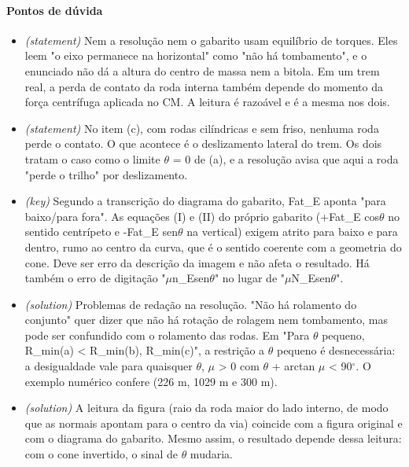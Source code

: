 \documentclass{article}%
\begin{document}
\paragraph{Pontos de dúvida}%
\begin{itemize}%
\item%
\textit{(statement)} Nem a resolução nem o gabarito usam equilíbrio de torques. Eles leem "o eixo permanece na horizontal" como "não há tombamento", e o enunciado não dá a altura do centro de massa nem a bitola. Em um trem real, a perda de contato da roda interna também depende do momento da força centrífuga aplicada no CM. A leitura é razoável e é a mesma nos dois.%
\item%
\textit{(statement)} No item (c), com rodas cilíndricas e sem friso, nenhuma roda perde o contato. O que acontece é o deslizamento lateral do trem. Os dois tratam o caso como o limite $\theta$ = 0 de (a), e a resolução avisa que aqui a roda "perde o trilho" por deslizamento.%
\item%
\textit{(key)} Segundo a transcrição do diagrama do gabarito, Fat\_E aponta "para baixo/para fora". As equações (I) e (II) do próprio gabarito (+Fat\_E cos$\theta$ no sentido centrípeto e -Fat\_E sen$\theta$ na vertical) exigem atrito para baixo e para dentro, rumo ao centro da curva, que é o sentido coerente com a geometria do cone. Deve ser erro da descrição da imagem e não afeta o resultado. Há também o erro de digitação "$\mu$n\_Esen$\theta$" no lugar de "$\mu$N\_Esen$\theta$".%
\item%
\textit{(solution)} Problemas de redação na resolução. "Não há rolamento do conjunto" quer dizer que não há rotação de rolagem nem tombamento, mas pode ser confundido com o rolamento das rodas. Em "Para $\theta$ pequeno, R\_min(a) < R\_min(b), R\_min(c)", a restrição a $\theta$ pequeno é desnecessária: a desigualdade vale para quaisquer $\theta$, $\mu$ > 0 com $\theta$ + arctan $\mu$ < 90$^\circ$. O exemplo numérico confere (226 m, 1029 m e 300 m).%
\item%
\textit{(solution)} A leitura da figura (raio da roda maior do lado interno, de modo que as normais apontam para o centro da via) coincide com a figura original e com o diagrama do gabarito. Mesmo assim, o resultado depende dessa leitura: com o cone invertido, o sinal de $\theta$ mudaria.%
\end{itemize}%
\end{document}
